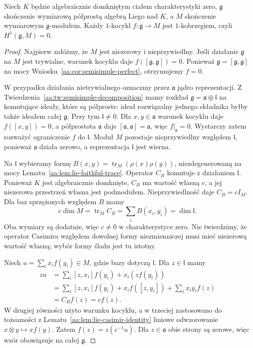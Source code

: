 \begin{twierdzenie}
\label{aa:tw:lie-whitehead-one}
Niech $K$ będzie algebraicznie domkniętym ciałem charakterystyki zero, $\mathfrak g$ skończenie wymiarową półprostą algebrą Liego nad $K$, a $M$ skończenie wymiarowym $\mathfrak g$-modułem. Każdy $1$-kocykl $f:\mathfrak g\to M$ jest $1$-kobrzegiem, czyli $H^1(\mathfrak g,M)=0$.
\end{twierdzenie}
\begin{proof}
Najpierw załóżmy, że $M$ jest niezerowy i nieprzywiedlny. Jeśli działanie $\mathfrak g$ na $M$ jest trywialne, warunek kocyklu daje $f([\mathfrak g,\mathfrak g])=0$. Ponieważ $\mathfrak g=[\mathfrak g,\mathfrak g]$ na mocy Wniosku~\ref{aa:cor:semisimple-perfect}, otrzymujemy $f=0$.

W przypadku działania nietrywialnego oznaczmy przez $\mathfrak a$ jądro reprezentacji. Z Twierdzenia~\ref{aa:tw:semisimple-decomposition} mamy rozkład $\mathfrak g=\mathfrak a\oplus\mathfrak l$ na komutujące ideały, które są półproste: ideał rozwiązalny jednego składnika byłby także ideałem całej $\mathfrak g$. Przy tym $\mathfrak l\ne0$. Dla $x,y\in\mathfrak a$ warunek kocyklu daje $f([x,y])=0$, a półprostota $\mathfrak a$ daje $[\mathfrak a,\mathfrak a]=\mathfrak a$, więc $f|_{\mathfrak a}=0$. Wystarczy zatem rozważyć ograniczenie $f$ do $\mathfrak l$. Moduł $M$ pozostaje nieprzywiedlny względem $\mathfrak l$, ponieważ $\mathfrak a$ działa zerowo, a reprezentacja $\mathfrak l$ jest wierna.

Na $\mathfrak l$ wybieramy formę $B(x,y)=\operatorname{tr}_M(\rho(x)\rho(y))$, niezdegenerowaną na mocy Lematu~\ref{aa:lem:lie-faithful-trace}. Operator $C_B$ komutuje z działaniem $\mathfrak l$. Ponieważ $K$ jest algebraicznie domknięte, $C_B$ ma wartość własną $c$, a jej niezerowa przestrzeń własna jest podmodułem. Nieprzywiedlność daje $C_B=cI_M$. Dla baz sprzężonych względem $B$ mamy
\[
 c\dim M=\operatorname{tr}_M C_B
 =\sum_i B(x_i,y_i)=\dim\mathfrak l.
\]
Oba wymiary są dodatnie, więc $c\ne0$ w charakterystyce zero. Nie twierdzimy, że operator Casimira względem dowolnej formy niezmienniczej musi mieć niezerową wartość własną; wybór formy śladu jest tu istotny.

Niech $u=\sum_i x_i f(y_i)\in M$, gdzie bazy dotyczą $\mathfrak l$. Dla $z\in\mathfrak l$ mamy
\begin{align*}
 zu&=\sum_i [z,x_i]f(y_i)+x_i(zf(y_i))\\
   &=\sum_i [z,x_i]f(y_i)+x_i f([z,y_i])
       +\sum_i x_i y_i f(z)\\
   &= C_B f(z)=cf(z).
\end{align*}
W drugiej równości użyto warunku kocyklu, a w trzeciej zastosowano do tożsamości z Lematu~\ref{aa:lem:lie-casimir-identity} liniowe odwzorowanie $x\otimes y\mapsto xf(y)$. Zatem $f(z)=z(c^{-1}u)$. Dla $z\in\mathfrak a$ obie strony są zerowe, więc wzór obowiązuje na całej $\mathfrak g$.


\end{proof}
